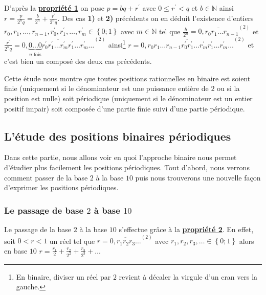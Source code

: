 \documentclass[a4paper,french,12pt]{article}
\begin{document}
\begin{enumerate}
D'après la \hyperlink{15}{\textbf{propriété 1}} on pose $p=bq+r^{\prime}$ avec $0\leqslant r^{\prime}<q$ et $b\in\mathbb{N}$ ainsi $r=\frac{p}{2^nq}=\frac{b}{2^n}+\frac{r^{\prime}}{2^nq}$. Des cas \textbf{1)} et \textbf{2)} précédents on en déduit l'existence d'entiers $r_0,r_1,\ldots,r_{n-1},r^{\prime}_0,r^{\prime}_1,\ldots,r^{\prime}_m\in\left\{0;1\right\}$ avec $m\in\mathbb{N}$ tel que $\frac{b}{2^n}=\overline{0{,}r_0r_1\ldots r_{n-1}}^{\left(2\right)}$ et $\frac{r^{\prime}}{2^nq}=\overline{0{,}\underbrace{0\ldots0}_{n\text{ fois}}r^{\prime}_0r^{\prime}_1\ldots r^{\prime}_mr^{\prime}_1\ldots r^{\prime}_m\ldots}^{\left(2\right)}$ ainsi\footnote{En binaire, diviser un réel par $2$ revient à décaler la virgule d'un cran vers la gauche.} $r=\overline{0{,}r_0r_1\ldots r_{n-1}r^{\prime}_0r^{\prime}_1\ldots r^{\prime}_mr^{\prime}_1\ldots r^{\prime}_m\ldots}^{\left(2\right)}$ et c'est bien un composé des deux cas précédents.
\end{enumerate}

Cette étude nous montre que toutes positions rationnelles en binaire est soient finie (uniquement si le dénominateur est une puissance entière de $2$ ou si la position est nulle) soit périodique (uniquement si le dénominateur est un entier positif impair) soit composée d'une partie finie suivi d'une partie périodique.

\subsection{L'étude des positions binaires périodiques}
Dans cette partie, nous allons voir en quoi l'approche binaire nous permet d'étudier plus facilement les positions périodiques. Tout d'abord, nous verrons comment passer de la base $2$ à la base $10$ puis nous trouverons une nouvelle façon d'exprimer les positions périodiques.
\subsubsection{Le passage de base $2$ à base $10$}
Le passage de la base $2$ à la base $10$ s'effectue grâce à la \hyperlink{5}{\textbf{propriété 2}}. En effet, soit $0<r<1$ un réel tel que $r=\overline{0{,}r_1r_2r_3\ldots}^{\left(2\right)}$ avec $r_1,r_2,r_3,\ldots\in\left\{0;1\right\}$ alors en base $10$ $r=\frac{r_1}{2}+\frac{r_2}{2^2}+\frac{r_3}{2^3}+\ldots$ 
\end{document}
